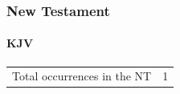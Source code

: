 				
			
		
		
	\subsubsection{New Testament} %
		\label{ADVOCATE-NT}
	
		\paragraph{KJV}
			\label{ADVOCATE-NT-KJV}		
	
			\begin{tabular}{ll}
				Total occurrences in the NT & 1
			\end{tabular}
			
